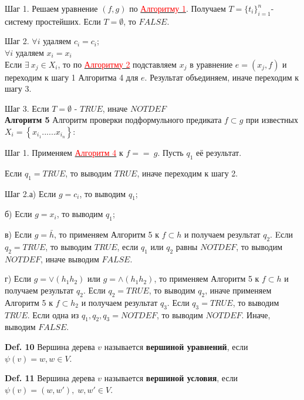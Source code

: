 \documentclass[12pt]{article}
\begin{document}
\begin{comment}     
     Шаг 0. Если $Len(f) \neq Len(g)$, то $FALSE$, иначе переходим к шагу 1.
\end{comment}     
     Шаг 1. Решаем уравнение $(f,g)$ по \hyperlink{a1}{ \textcolor{red} {Алгоритму 1}}.  Получаем  $T = \lbrace  t_{i}  \rbrace_{i=1}^{n} $- систему простейших. Если  $ T= {\emptyset}$, то $FALSE$.
     
     Шаг 2. $\forall i$ удаляем $c_{i} = c_{i}$; 
     \\
      $\forall i$ удаляем $x_{i} = x_{i}$
     \\ 
     Если $\exists \: x_{j} \in X_{i}$, то по \hyperlink{a2}{ \textcolor{red}{Алгоритму 2}} подставляем $x_{j}$  в уравнение $e = (x_{j}, f)$ и переходим к шагу 1 Алгоритма 4 для $e$. Результат объединяем, иначе переходим к шагу 3.
     
     Шаг 3. Если $ T= {\emptyset}$ - $TRUE$, иначе $NOTDEF$
     \\
     
      \hypertarget{a5}{{\bf Алгоритм 5}} Алгоритм проверки подформульного предиката $f \subset g $ при известных $ X_{i} = \left\lbrace x_{i_{1}} ......x_{i_{n}}\right\rbrace $:
\begin{comment}
     Шаг 0. Если $Len(f) > Len(g)$, то $FALSE$, иначе переходим к шагу 1.
\end{comment} 
    
     Шаг 1. Применяем \hyperlink{a3}{ \textcolor{red}{Алгоритм 4}}  к $f == \:g$. Пусть $q_{1}$ её результат.
\begin{comment}
      Если $q_{1} = NOTDEF$, то выводим $q_{1}$
\end{comment}
     
      Если $q_{1} = TRUE$, то выводим $TRUE$, иначе переходим к шагу 2.
     
     Шаг 2.а) Если $ g = c_{i}$, то выводим $q_{1}$;
     
      б) Если $ g = x_{i}$, то выводим $q_{1}$;
      
    в) Если $ g = \bar h$, то применяем  Алгоритм 5 к  $f\subset h$ и получаем результат $q_{2}$. Eсли $q_{2} = TRUE$, то выводим $TRUE$, если $q_{1}$ или $q_{2}$ равны $NOTDEF$, то выводим $NOTDEF$, иначе выводим $FALSE$.
    
    г) Если $ g = \vee (h_{1} h_{2})$ или  $ g = \wedge (h_{1} h_{2})$, то применяем  Алгоритм 5 к  $f\subset h$   и получаем результат $q_{2}$. Если $q_{2} = TRUE$, то выводим $q_{2}$, иначе применяем Алгоритм 5 к $f\subset h_{2}$ и  получаем результат  $q_{3}$. Если $q_{3} = TRUE$, то выводим $TRUE$. Если одна из $q_{1}, q_{2}, q_{3} = NOTDEF$, то выводим $NOTDEF$. Иначе, выводим $FALSE$.

 
     {\bf Def. 10} Вершина дерева $v$ называется {\bf вершиной уравнений}, если
     $\psi(v)=w , w \in V$.
     
     {\bf Def. 11} Вершина дерева $v$ называется {\bf вершиной условия}, если
     $\psi(v)=(w,w') ,\; w,w' \in V$.
     
     
     
     
     
     
\end{document}
